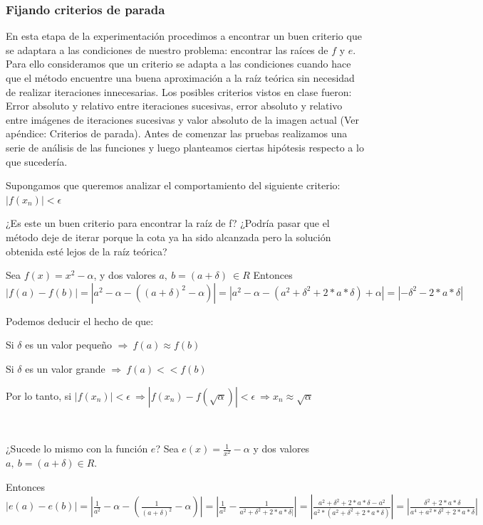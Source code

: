 \subsubsection{Fijando criterios de parada}

En esta etapa de la experimentación procedimos a encontrar un buen criterio que se adaptara a las condiciones de nuestro problema: encontrar las raíces de $f$ y $e$.
Para ello consideramos que un criterio se adapta a las condiciones cuando hace que el método encuentre una buena aproximación a la raíz
teórica sin necesidad de realizar iteraciones innecesarias. 
Los posibles criterios vistos en clase fueron: Error absoluto y relativo entre iteraciones sucesivas, error absoluto y relativo entre imágenes de iteraciones sucesivas y
valor absoluto de la imagen actual (Ver apéndice: Criterios de parada).
Antes de comenzar las pruebas realizamos una serie de análisis de las funciones y luego planteamos ciertas hipótesis respecto a lo que sucedería.

Supongamos que queremos analizar el comportamiento del siguiente criterio:
$|f(x_{n})| < \epsilon $

¿Es este un buen criterio para encontrar la raíz de f? ¿Podría pasar que el método deje de iterar porque la cota ya ha sido alcanzada pero la solución obtenida esté lejos de la 
raíz teórica?

Sea $f(x) = x^{2} - \alpha$, y dos valores $a, \ b=(a+\delta) \  \in R$ Entonces $|f(a) - f(b)| = |a^{2} - \alpha - ((a+\delta)^{2} - \alpha )| = |a^{2} - \alpha - (a^{2}+\delta^{2}+2*a*\delta) + \alpha | =
|-\delta^{2}-2*a*\delta|$

Podemos deducir el hecho de que:

Si $\delta$ es un valor peque\~no $\Rightarrow \ f(a) \approx f(b) $

Si $\delta$ es un valor grande $\Rightarrow \ f(a) << f(b) $

Por lo tanto, si $|f(x_{n})| < \epsilon \ \Rightarrow |f(x_{n}) - f(\sqrt{\alpha})| < \epsilon \ \Rightarrow x_{n} \approx \sqrt{\alpha}$

~

¿Sucede lo mismo con la función $e$? Sea $e(x) = \frac{1}{x^{2}} - \alpha$ y dos valores $a, \ b=(a+\delta) \in R$. 

Entonces $|e(a) - e(b)| = |\frac{1}{a^{2}} - \alpha - (\frac{1}{(a+\delta)^{2}} - \alpha) | =
|\frac{1}{a^{2}} - \frac{1}{a^{2}+\delta^{2}+2*a*\delta|} | = | \frac{a^{2}+\delta^{2}+2*a*\delta-a^{2}}{a^{2}*(a^{2}+\delta^{2}+2*a*\delta)} | = |\frac{\delta^{2}+2*a*\delta}{a^{4}+a^{2}*\delta^{2}+2*a*\delta}|$

